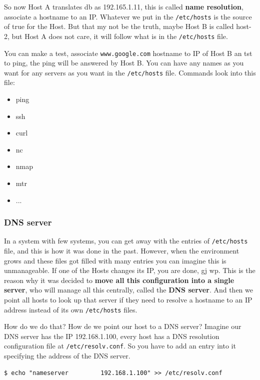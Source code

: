 \documentclass{article}
\newenvironment{codetemplate}[1][]{%
  \mybasecolorbox[#1]
  \itshape
}{%
  \endmybasecolorbox
}
\begin{document}
So now Host A translates db as 192.165.1.11, this is called \textbf{name resolution}, associate a hostname to an IP. Whatever we put in the \verb|/etc/hosts| is the source of true for the Host. But that my not be the truth, maybe Host B is called host-2, but Host A does not care, it will follow what is in the \verb|/etc/hosts| file. 

You can make a test, associate \verb|www.google.com| hostname to IP of Host B an tst to ping, the ping will be answered by Host B. You can have any names as you want for any servers as you want in the \verb|/etc/hosts| file. Commands look into this file:

\begin{itemize}
    \item ping
    \item ssh
    \item curl
    \item nc
    \item nmap
    \item mtr
    \item ...
\end{itemize}

\subsubsection{DNS server}

In a system with few systems, you can get away with the entries of \verb|/etc/hosts| file, and this is how it was done in the past. However, when the environment grows and these files got filled with many entries you can imagine this is unmanageable. If one of the Hosts changes its IP, you are done, gj wp. This is the reason why it was decided to \textbf{move all this configuration into a single server}, who will manage all this centrally, called the \textbf{DNS server}. And then we point all hosts to look up that server if they need to resolve a hostname to an IP address instead of its own \verb|/etc/hosts| files.

How do we do that? How de we point our host to a DNS server? Imagine our DNS server has the IP 192.168.1.100, every host has a DNS resolution configuration file at \verb|/etc/resolv.conf|. So you have to add an entry into it specifying the address of the DNS server.

\begin{codetemplate}{}
\begin{verbatim}
$ echo "nameserver         192.168.1.100" >> /etc/resolv.conf
\end{verbatim}
\end{codetemplate}
\end{document}

